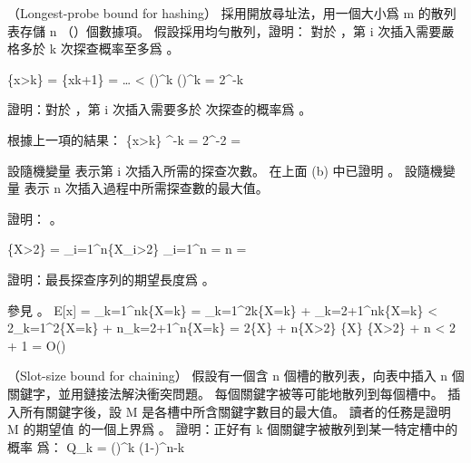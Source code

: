 \startsubject[
  title={Problems},
]

\startPROBLEM
（Longest-probe bound for hashing）
採用開放尋址法，用一個大小爲 m 的散列表存儲 n （）個數據項。
\startigBase[a]
\startitem
假設採用均勻散列，證明：
對於 ，第 i 次插入需要嚴格多於 k 次探查概率至多爲 。
\stopitem

\startANSWER
\startformula\startmathalignment
\NC \Pr\{x>k\}
    \NC = \Pr\{x\ge k+1\} \NR
\NC \NC =  \cdot {} \cdot \ldots \cdot {} \qquad {} \NR
\NC \NC < ()^k \NR
\NC \NC \le ()^k \NR
\NC \NC = 2^{-k} \NR
\stopmathalignment\stopformula
\stopANSWER

\startitem
證明：對於 ，第 i 次插入需要多於  次探查的概率爲 。
\stopitem

\startANSWER
根據上一項的結果：
\startformula
\Pr\{x>k\} ^{-k} = 2^{-2} = 
\stopformula
\stopANSWER

設隨機變量  表示第 i 次插入所需的探查次數。
在上面 (b) 中已證明 。
設隨機變量  表示 n 次插入過程中所需探查數的最大值。

\startitem
證明： 。
\stopitem

\startANSWER
\startformula
\Pr\{X>2\}
  = \sum_{i=1}^{n}\Pr\{X_i>2\}
  \le \sum_{i=1}^{n}
  = n \cdot {}
  = 
\stopformula
\stopANSWER

\startitem
證明：最長探查序列的期望長度爲 。
\stopitem

\startANSWER
參見 。
\startformula\startmathalignment
\NC E[x]
    \NC = \sum_{k=1}^{n}k\Pr\{X=k\} \NR
\NC \NC = \sum_{k=1}^{2}k\Pr\{X=k\} + \sum_{k=2+1}^{n}k\Pr\{X=k\} \NR
\NC \NC < 2\sum_{k=1}^{2}\Pr\{X=k\} + n\sum_{k=2+1}^{n}\Pr\{X=k\} \NR
\NC \NC = 2\Pr\{X\} + n\Pr\{X>2\} \qquad {}
	  \Pr\{X\} \qquad
	  \Pr\{X>2\} \le {} \NR
\NC \NC {} + n \cdot {} \NR
\NC \NC < 2 + 1 \NR
\NC \NC = O() \NR
\stopmathalignment\stopformula
\stopANSWER

\stopigBase
\stopPROBLEM

\startPROBLEM
（Slot-size bound for chaining）
假設有一個含 n 個槽的散列表，向表中插入 n 個關鍵字，並用鏈接法解決衝突問題。
每個關鍵字被等可能地散列到每個槽中。
插入所有關鍵字後，設 M 是各槽中所含關鍵字數目的最大值。
讀者的任務是證明 M 的期望值  的一個上界爲 。
\startigBase[a]
\startitem
證明：正好有 k 個關鍵字被散列到某一特定槽中的概率  爲：
\startformula
Q_k = ()^k (1-)^{n-k} 
\stopformula
\stopitem

